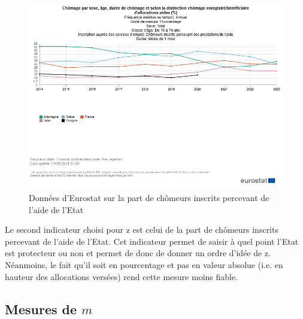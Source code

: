 \documentclass{article}
\begin{document}
  \begin{figure}[H]
    \centering
    \begin{minipage}{0.8\textwidth}
        \centering
        \includegraphics[width=\textwidth]{"allocations.png"}
        \caption{Données d'Eurostat sur la part de chômeurs inscrits percevant de l'aide de l'Etat}
    \end{minipage}
  \end{figure}
\vspace{0.5cm}

Le second indicateur choisi pour z est celui de la part de chômeurs inscrits percevant de l'aide de l'Etat. Cet indicateur permet de saisir à quel point l'Etat est protecteur ou non et permet de donc de donner un ordre d'idée de z. Néanmoins, le fait qu'il soit en pourcentage et pas en valeur absolue (i.e. en hauteur des allocations versées) rend cette mesure moins fiable.


\subsection{Mesures de $m$}
\end{document}

